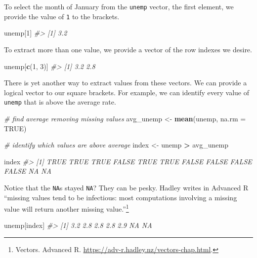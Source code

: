 \documentclass[
]{book}
\newenvironment{Shaded}{\begin{snugshade}}{\end{snugshade}}
\newcommand{\CommentTok}[1]{\textcolor[rgb]{0.56,0.35,0.01}{\textit{#1}}}
\newcommand{\DataTypeTok}[1]{\textcolor[rgb]{0.13,0.29,0.53}{#1}}
\newcommand{\DecValTok}[1]{\textcolor[rgb]{0.00,0.00,0.81}{#1}}
\newcommand{\KeywordTok}[1]{\textcolor[rgb]{0.13,0.29,0.53}{\textbf{#1}}}
\newcommand{\NormalTok}[1]{#1}
\newcommand{\OperatorTok}[1]{\textcolor[rgb]{0.81,0.36,0.00}{\textbf{#1}}}
\newcommand{\OtherTok}[1]{\textcolor[rgb]{0.56,0.35,0.01}{#1}}
\newcommand{\StringTok}[1]{\textcolor[rgb]{0.31,0.60,0.02}{#1}}
\begin{document}
To select the month of January from the \texttt{unemp} vector, the first element, we provide the value of \texttt{1} to the brackets.

\begin{Shaded}
\begin{Highlighting}[]
\NormalTok{unemp[}\DecValTok{1}\NormalTok{]}
\CommentTok{\#\textgreater{} [1] 3.2}
\end{Highlighting}
\end{Shaded}

To extract more than one value, we provide a vector of the row indexes we desire.

\begin{Shaded}
\begin{Highlighting}[]
\NormalTok{unemp[}\KeywordTok{c}\NormalTok{(}\DecValTok{1}\NormalTok{, }\DecValTok{3}\NormalTok{)]}
\CommentTok{\#\textgreater{} [1] 3.2 2.8}
\end{Highlighting}
\end{Shaded}

There is yet another way to extract values from these vectors. We can provide a logical vector to our square brackets. For example, we can identify every value of \texttt{unemp} that is above the average rate.

\begin{Shaded}
\begin{Highlighting}[]
\CommentTok{\# find average removing missing values}
\NormalTok{avg\_unemp \textless{}{-}}\StringTok{ }\KeywordTok{mean}\NormalTok{(unemp, }\DataTypeTok{na.rm =} \OtherTok{TRUE}\NormalTok{)}

\CommentTok{\# identify which values are above average}
\NormalTok{index \textless{}{-}}\StringTok{ }\NormalTok{unemp }\OperatorTok{\textgreater{}}\StringTok{ }\NormalTok{avg\_unemp}

\NormalTok{index}
\CommentTok{\#\textgreater{}  [1]  TRUE  TRUE  TRUE FALSE  TRUE  TRUE FALSE FALSE FALSE FALSE    NA    NA}
\end{Highlighting}
\end{Shaded}

Notice that the \texttt{NA}s stayed \texttt{NA}? They can be pesky. Hadley writes in Advanced R ``missing values tend to be infectious: most computations involving a missing value will return another missing value.''\footnote{Vectors. Advanced R. \url{https://adv-r.hadley.nz/vectors-chap.html}.}

\begin{Shaded}
\begin{Highlighting}[]
\NormalTok{unemp[index]}
\CommentTok{\#\textgreater{} [1] 3.2 2.8 2.8 2.8 2.9  NA  NA}
\end{Highlighting}
\end{Shaded}
\end{document}
